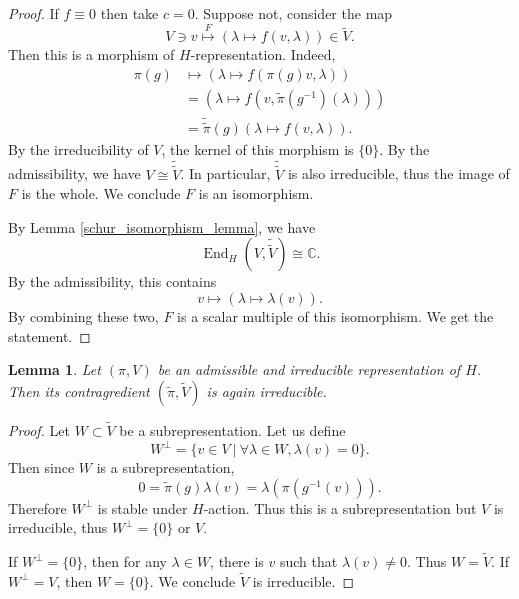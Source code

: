 \documentclass[8pt]{article}
\newtheorem{lemma}{Lemma}[section]
\DeclareMathOperator{\End}{End}
\newcommand{\C}[0]{\mathbb{C}}
\newcommand{\sep}[0]{\:|\:}
\begin{document}
\begin{proof}
  If $f\equiv0$ then take $c=0$. Suppose not, consider the map 
  \begin{equation*}
    V\ni v\stackrel{F}{\mapsto} (\lambda\mapsto f(v,\lambda))\in \widetilde{V}.
  \end{equation*} 
  Then this is a morphism of $H$-representation. Indeed,
  \begin{align*}
    \pi(g) &\mapsto (\lambda\mapsto f(\pi(g)v,\lambda))\\
    & = (\lambda\mapsto f(v,\widetilde{\pi}(g^{-1})(\lambda)))\\
    & = \widetilde{\widetilde{\pi}}(g)(\lambda\mapsto f(v,\lambda)).
  \end{align*}
  By the irreducibility of $V$, the kernel of this morphism is $\{0\}$. By the admissibility, we have $V\cong\widetilde{\widetilde{V}}$.
  In particular, $\widetilde{\widetilde{V}}$ is also irreducible, thus the image of $F$ is the whole. We conclude $F$ is an isomorphism. 
  \par By Lemma \ref{schur_isomorphism_lemma}, we have 
  \begin{equation*}
    \End_H(V,\widetilde{\widetilde{V}})\cong\C.
  \end{equation*}
  By the admissibility, this contains
  \begin{equation*}
    v\mapsto(\lambda\mapsto\lambda(v)).
  \end{equation*}
  By combining these two, $F$ is a scalar multiple of this isomorphism. We get the statement.
\end{proof}

\begin{lemma}
  \label{contragredient_irreducibility}
  Let $(\pi,V)$ be an admissible and irreducible representation of $H$. Then its contragredient $(\widetilde{\pi},\widetilde{V})$ is again irreducible.
\end{lemma}

\begin{proof}
  Let $W\subset\widetilde{V}$ be a subrepresentation. Let us define 
  \begin{equation*}
    W^{\perp} = \{v\in V\sep \forall \lambda\in W, \lambda(v) = 0\}.
  \end{equation*}
  Then since $W$ is a subrepresentation,
  \begin{equation*}
    0 = \widetilde{\pi}(g)\lambda(v) = \lambda(\pi(g^{-1}(v))).
  \end{equation*}
  Therefore $W^\perp$ is stable under $H$-action. Thus this is a subrepresentation but $V$ is irreducible, thus $W^\perp = \{0\}$ or $V$. 
  \par If $W^\perp=\{0\}$, then for any $\lambda\in W$, there is $v$ such that $\lambda(v) \not = 0$. Thus $W = \widetilde{V}$. If $W^\perp = V$, then $W = \{0\}$. 
  We conclude $\widetilde{V}$ is irreducible.
\end{proof}
\end{document}
